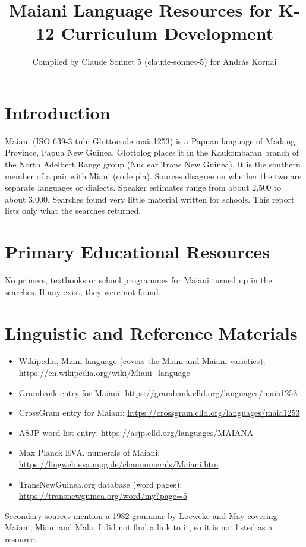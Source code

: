 \documentclass[12pt]{article}
\title{Maiani Language Resources for K-12 Curriculum Development}
\author{Compiled by Claude Sonnet 5 (claude-sonnet-5) for Andr\'as Kornai}
\date{}
\begin{document}
\maketitle

\section{Introduction}
Maiani (ISO 639-3 tnh; Glottocode maia1253) is a Papuan language of Madang Province, Papua New Guinea. Glottolog places it in the Kaukombaran branch of the North Adelbert Range group (Nuclear Trans New Guinea). It is the southern member of a pair with Miani (code pla). Sources disagree on whether the two are separate languages or dialects. Speaker estimates range from about 2,500 to about 3,000. Searches found very little material written for schools. This report lists only what the searches returned.

\section{Primary Educational Resources}
No primers, textbooks or school programmes for Maiani turned up in the searches. If any exist, they were not found.

\section{Linguistic and Reference Materials}
\begin{itemize}
\item Wikipedia, Miani language (covers the Miani and Maiani varieties): \url{https://en.wikipedia.org/wiki/Miani_language}
\item Grambank entry for Maiani: \url{https://grambank.clld.org/languages/maia1253}
\item CrossGram entry for Maiani: \url{https://crossgram.clld.org/languages/maia1253}
\item ASJP word-list entry: \url{https://asjp.clld.org/languages/MAIANA}
\item Max Planck EVA, numerals of Maiani: \url{https://lingweb.eva.mpg.de/channumerals/Maiani.htm}
\item TransNewGuinea.org database (word pages): \url{https://transnewguinea.org/word/my?page=5}
\end{itemize}
Secondary sources mention a 1982 grammar by Loeweke and May covering Maiani, Miani and Mala. I did not find a link to it, so it is not listed as a resource.
\end{document}
